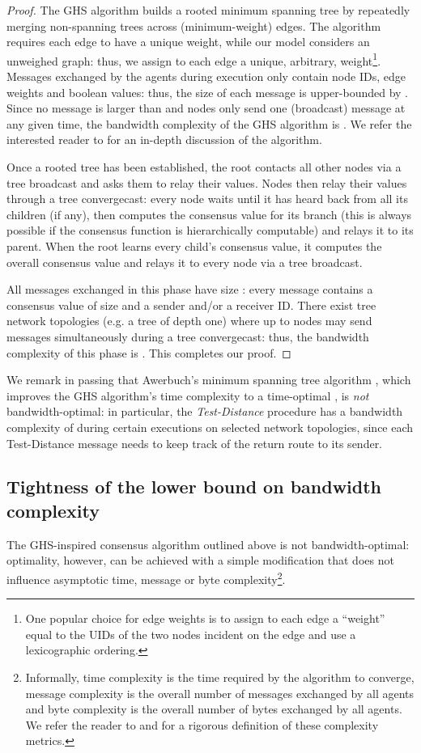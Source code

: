 \documentclass[letterpaper,10pt,conference]{ieeeconf}
\begin{document}
\begin{proof}
The GHS algorithm builds a rooted minimum spanning tree by repeatedly merging non-spanning trees across (minimum-weight) edges. The algorithm requires each edge to have a unique weight, while our model considers an unweighed graph: thus, we assign to each edge a unique, arbitrary, weight\footnote{One popular choice for edge weights is to assign to each edge a ``weight'' equal to the UIDs of the two nodes incident on the edge and use a lexicographic ordering.}. Messages exchanged by the agents during execution only contain node IDs, edge weights and boolean values: thus, the size of each message is upper-bounded by . Since no message is larger than  and nodes only send one (broadcast) message at any given time, the bandwidth complexity of the GHS algorithm is . We refer the interested reader to \cite{RGG-PAH-PMS:83} for an in-depth discussion of the algorithm. 

Once a rooted tree has been established, the root contacts all other nodes via a tree broadcast and asks them to relay their values. Nodes then relay their values through a tree convergecast: every node waits until it has heard back from all its children (if any), then computes the consensus value for its branch (this is always possible if the consensus function is hierarchically computable) and relays it to its parent. When the root learns every child's consensus value, it computes the overall consensus value and relays it to every node via a tree broadcast.

All messages exchanged in this phase have size : every message contains a consensus value of size  and a sender and/or a receiver ID. There exist tree network topologies (e.g. a tree of depth one) where up to  nodes may send messages simultaneously during a tree convergecast: thus, the bandwidth complexity of this phase is . This completes our proof.
\end{proof}

We remark in passing that  Awerbuch's minimum spanning tree algorithm \cite{BAw:87}, which improves the GHS algorithm's time complexity to a time-optimal , is \emph{not} bandwidth-optimal: in particular, the \emph{Test-Distance} procedure has a bandwidth complexity of  during certain executions on selected network topologies, since each Test-Distance message needs to keep track of the return route to its sender.

\subsection{Tightness of the lower bound on bandwidth complexity}
The GHS-inspired consensus algorithm outlined above is not bandwidth-optimal: optimality, however, can be achieved with a simple modification that does not influence asymptotic time, message or byte complexity\footnote{Informally, time complexity is the time required by the algorithm to converge, message complexity is the overall number of messages exchanged by all agents and byte complexity is the overall number of bytes exchanged by all agents. We refer the reader to \cite{FR-MP:13} and \cite{FR-MP:14a} for a rigorous definition of these complexity metrics.}.
\end{document}
